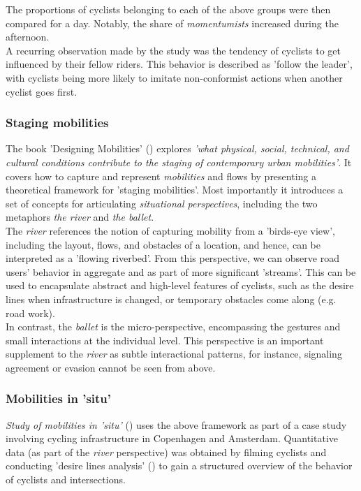 The proportions of cyclists belonging to each of the above groups were then compared for a day. 
Notably, the share of \textit{momentumists} increased during the afternoon.
 \ \\

A recurring observation made by the study was the tendency of cyclists to get influenced by their fellow riders. 
This behavior is described as 'follow the leader', with cyclists being more likely to imitate non-conformist 
actions when another cyclist goes first. 

\subsubsection{Staging mobilities}
The book 'Designing Mobilities' (\cite{designinig_mobilities}) explores \textit{'what physical, social, technical, 
and cultural conditions contribute to the staging of contemporary urban mobilities'}.
It covers how to capture and represent \textit{mobilities} and flows by presenting a theoretical framework for 'staging mobilities'. 
Most importantly it introduces a set of concepts for articulating \textit{situational perspectives}, 
including the two metaphors \textit{the river} and \textit{the ballet}. 
 \ \\

 The \textit{river} references the notion of capturing mobility from a 'birds-eye view', including the layout, 
 flows, and obstacles of a location, and hence, can be interpreted as a 'flowing riverbed'. 
 From this perspective, we can observe road users' behavior in aggregate and as part of more significant 'streams'. 
 This can be used to encapsulate abstract and high-level features of cyclists, such as the desire lines
 when infrastructure is changed, or temporary obstacles come along (e.g. road work).
 \ \\

In contrast, the \textit{ballet} is the micro-perspective, encompassing the gestures and small interactions at the individual level.
This perspective is an important supplement to the \textit{river} as subtle interactional patterns, for instance,
 signaling agreement or evasion cannot be seen from above.

\subsubsection{Mobilities in 'situ'}
\textit{Study of mobilities in 'situ'} (\cite{situ}) uses the above framework as part of a case study involving cycling infrastructure in 
Copenhagen and Amsterdam. Quantitative data (as part of the \textit{river} perspective) was obtained by filming cyclists and conducting 
'desire lines analysis' (\cite{cva}) to gain a structured overview of the behavior of cyclists and intersections. 
\ \\

